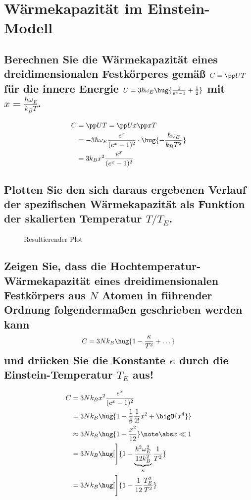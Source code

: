 \documentclass[exa]{exercise_5.0}
\begin{document}
\section{Wärmekapazität im Einstein-Modell}
\subsection{Berechnen Sie die Wärmekapazität eines dreidimensionalen Festkörperes gemäß \(C=\pp UT\) für die innere Energie \(U=3\hbar\omega_E\hug{\frac1{e^x - 1}  + \frac12} \) mit \(x=\frac{\hbar\omega_E}{k_BT}\).}

\dottedlinete

\begin{align*}
    C 
    &= \pp U T= \pp U x \pp xT\\
    &=  -3\hbar\omega_E \frac{e^x}{(e^x - 1)^2} \cdot \hug{-\frac{\hbar\omega_E}{k_B T^2}}\\    
    &=  3 k_B x^2 \frac{ e^x }{(e^x - 1)^2}  
\end{align*}

\subsection{Plotten Sie den sich daraus ergebenen Verlauf der spezifischen Wärmekapazität als Funktion der skalierten Temperatur $T/T_E$.}

\dottedlinett


\begin{figure}[H]
    \centering
    
    \caption{Resultierender Plot}
\end{figure}

\subsection{Zeigen Sie, dass die Hochtemperatur-Wärmekapazität eines dreidimensionalen Festkörpers aus $N$ Atomen in führender Ordnung folgendermaßen geschrieben werden kann
\begin{align*}
    C = 3Nk_B \hug{1-\frac\kappa {T^2} + \dots}
\end{align*}
und drücken Sie die Konstante $\kappa$ durch die Einstein-Temperatur $T_E$ aus!
}

\dottedlinete

\begin{align*}
    C &= 3 N k_B x^2 \frac{e^x}{(e^x - 1)^2}  \\
    &= 3 N k_B \hug{1- \frac16 \frac1{2!} x^2 + \bigO{x^4}}  \\
    &\approx 3 N k_B \hug{1 - \frac{x^2}{12}}  \note \abs x \ll 1\\
    &= 3 N k_B \hug[\Bigg]{1 - \underbrace{\frac{\hbar^2 \omega_E^2}{12 k_B^2}}_{\kappa} \frac1{T^2}}\\
    &= 3 N k_B \hug[\Bigg]{1 - \frac1{12}\frac{T_E^2}{T^2}}
\end{align*}
\end{document}
